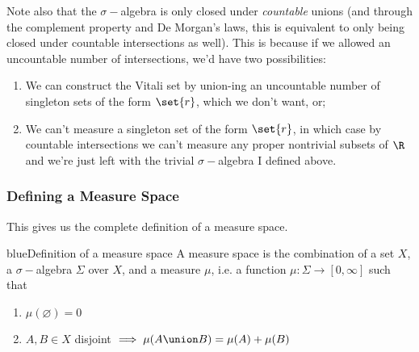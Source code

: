 \documentclass[../analysis.tex]{subfiles}
\begin{document}
    Note also that the $\sigma-$algebra is only closed under \emph{countable} unions (and through the complement property and De Morgan's laws, this is equivalent to only being closed under countable intersections as well). This is because if we allowed an uncountable number of intersections, we'd have two possibilities:

    \begin{enumerate}
        \item We can construct the Vitali set by union-ing an uncountable number of singleton sets of the form $\set{r}$, which we don't want, or;
        \item We can't measure a singleton set of the form $\set{r}$, in which case by countable intersections we can't measure any proper nontrivial subsets of $\R$ and we're just left with the trivial $\sigma-$algebra I defined above.
    \end{enumerate}




    \subsubsection{Defining a Measure Space}
    This gives us the complete definition of a measure space.

    \begin{mycolorbox}{blue}{Definition of a measure space}
        A measure space is the combination of a set $X$, a $\sigma-$algebra $\Sigma$ over $X$, and a measure $\mu$, i.e. a function $\mu: \Sigma \to [0, \infty]$ such that

        \begin{enumerate}
            \item $\mu(\varnothing) = 0$
            \item $A, B \in X$ disjoint $\implies \mu(A \union B) = \mu(A) + \mu(B)$
        \end{enumerate}
    \end{mycolorbox}
\end{document}

